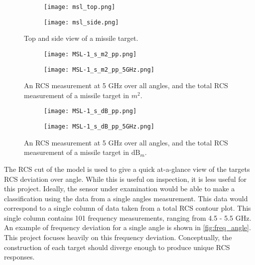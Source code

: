 	\begin{figure}[htbp]
	  \centering
	  \begin{subfigure}{.5\textwidth}
	    \centering
	    \texttt{[image: msl\_top.png]}
	  \end{subfigure}%
	  \begin{subfigure}{.5\textwidth}
	    \centering
	    \texttt{[image: msl\_side.png]}
	  \end{subfigure}
	  \caption[Target missile]{Top and side view of a missile target.}
	  \label{fig:msl_target}
	\end{figure}

	\begin{figure}[htbp]
	  \centering
	  \begin{subfigure}{.5\textwidth}
	    \centering
	    \texttt{[image: MSL-1\_s\_m2\_pp.png]}
	  \end{subfigure}%
	  \begin{subfigure}{.5\textwidth}
	    \centering
	    \texttt{[image: MSL-1\_s\_m2\_pp\_5GHz.png]}
	  \end{subfigure}
	  \caption[Missile RCS data sample (H-Pol)]{An RCS measurement at 5 GHz over all angles, and the total RCS measurement of a missile target in $m^2$.}
	  \label{fig:msl_m2}
	\end{figure}

	\begin{figure}[htbp]
	  \centering
	  \begin{subfigure}{.5\textwidth}
	    \centering
	    \texttt{[image: MSL-1\_s\_dB\_pp.png]}
	  \end{subfigure}%
	  \begin{subfigure}{.5\textwidth}
	    \centering
	    \texttt{[image: MSL-1\_s\_dB\_pp\_5GHz.png]}
	  \end{subfigure}
	  \caption[Missile RCS data sample (V-Pol)]{An RCS measurement at 5 GHz over all angles, and the total RCS measurement of a missile target in $\textrm{dB}_m$.}
	  \label{fig:msl_db}
	\end{figure}

	The RCS cut of the model is used to give a quick at-a-glance view of the targets RCS deviation over angle. While this is useful on inspection, it is less useful for this project. Ideally, the sensor under examination would be able to make a classification using the data from a single angles measurement. This data would correspond to a single column of data taken from a total RCS contour plot. This single column contains 101 frequency measurements, ranging from 4.5 - 5.5 GHz. An example of frequency deviation for a single angle is shown in \ref{fig:freq_angle}. This project focuses heavily on this frequency deviation. Conceptually, the construction of each target should diverge enough to produce unique RCS responses.

